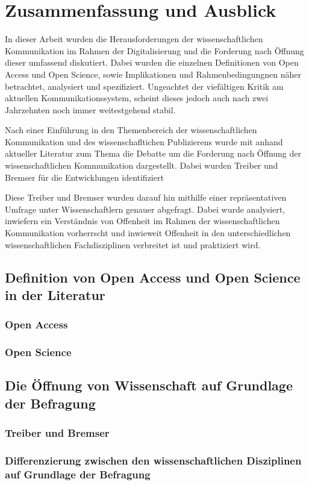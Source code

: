 \chapter{Zusammenfassung und Ausblick}

In dieser Arbeit wurden die Herausforderungen der wissenschaftlichen Kommunikation im Rahmen der Digitalisierung und die Forderung nach Öffnung dieser umfassend diskutiert. Dabei wurden die einzelnen Definitionen von Open Access und Open Science, sowie Implikationen und Rahmenbedingungnen näher betrachtet, analysiert und spezifiziert. Ungeachtet der viefältigen Kritik am aktuellen Kommunikationssystem, scheint dieses jedoch auch nach zwei Jahrzehnten noch immer weitestgehend stabil.

Nach einer Einführung in den Themenbereich der wissenschaftlichen Kommunikation und des wissenschafltichen Publizierens wurde mit anhand aktueller Literatur zum Thema die Debatte um die Forderung nach Öffnung der wissenschaftlichen Kommunikation dargestellt. Dabei wurden Treiber und Bremser für die Entwicklungen identifiziert 

Diese Treiber und Bremser wurden darauf hin mithilfe einer repräsentativen Umfrage unter Wissenschaftlern genauer abgefragt. Dabei wurde analysiert, inwiefern ein Verständnis von Offenheit im Rahmen der wissenschaftlichen Kommunikation vorherrscht und inwieweit Offenheit in den unterschiedlichen wissenschaftlichen Fachdisziplinen verbreitet ist und praktiziert wird.

\section{Definition von Open Access und Open Science in der Literatur}
\subsection{Open Access}
\subsection{Open Science}
\section{Die Öffnung von Wissenschaft auf Grundlage der Befragung}
\subsection{Treiber und Bremser}
\subsection{Differenzierung zwischen den wissenschaftlichen Disziplinen auf Grundlage der Befragung}
